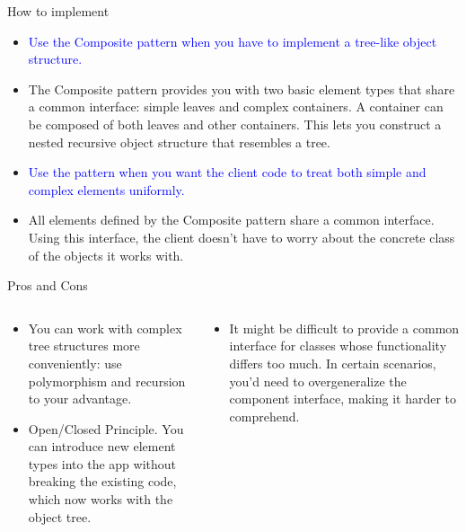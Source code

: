 \documentclass[13pt]{beamer}
\begin{document}
\begin{frame}{How to implement}
	\begin{itemize}
		\item \textcolor{blue}{Use the Composite pattern when you have to implement a tree-like object structure.}
		\item The Composite pattern provides you with two basic element types that share a common interface: simple leaves and complex containers. A container can be composed of both leaves and other containers. This lets you construct a nested recursive object structure that resembles a tree.
		\item \textcolor{blue}{Use the pattern when you want the client code to treat both simple and complex elements uniformly.}
		\item All elements defined by the Composite pattern share a common interface. Using this interface, the client doesn’t have to worry about the concrete class of the objects it works with.
	\end{itemize}
\end{frame}

\begin{frame}{Pros and Cons}
\begin{columns}[T]
\begin{column}{.45\textwidth}
	\begin{itemize}
	\item You can work with complex tree structures more conveniently: use polymorphism and recursion to your advantage.
	\item Open/Closed Principle. You can introduce new element types into the app without breaking the existing code, which now works with the object tree.
	\end{itemize}
\end{column}

\begin{column}{.45\textwidth}
	\begin{itemize}
	\item It might be difficult to provide a common interface for classes whose functionality differs too much. In certain scenarios, you’d need to overgeneralize the component interface, making it harder to comprehend.
	\end{itemize}
\end{column}
\end{columns}
\end{frame}
\end{document}
